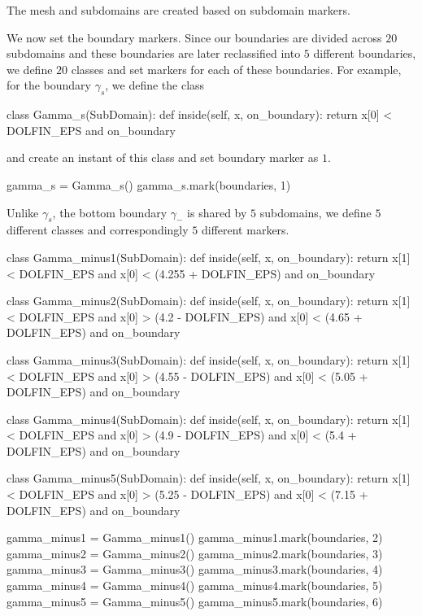 The mesh and subdomains are created based on subdomain markers.

We now set the boundary markers. Since our boundaries are divided across $20$ subdomains and these boundaries are later reclassified into $5$ different boundaries, we define $20$ classes and set markers for each of these boundaries. For example, for the boundary $\gamma_s$, we define the class
\begin{python}
class Gamma_s(SubDomain):
	def inside(self, x, on_boundary):
		return x[0] < DOLFIN_EPS and on_boundary
\end{python}
and create an instant of this class and set boundary marker as $1$.
\begin{python}
gamma_s = Gamma_s()
gamma_s.mark(boundaries, 1)
\end{python}

Unlike $\gamma_s$, the bottom boundary $\gamma_-$ is shared by $5$ subdomains, we define $5$ different classes and correspondingly $5$ different markers.

\begin{python}
class Gamma_minus1(SubDomain):
	def inside(self, x, on_boundary):
		return x[1] < DOLFIN_EPS and x[0] < (4.255 + DOLFIN_EPS) and on_boundary

class Gamma_minus2(SubDomain):
	def inside(self, x, on_boundary):
		return x[1] < DOLFIN_EPS and x[0] > (4.2 - DOLFIN_EPS) and x[0] < (4.65 + DOLFIN_EPS) and on_boundary

class Gamma_minus3(SubDomain):
	def inside(self, x, on_boundary):
		return x[1] < DOLFIN_EPS and x[0] > (4.55 - DOLFIN_EPS) and x[0] < (5.05 + DOLFIN_EPS) and on_boundary

class Gamma_minus4(SubDomain):
	def inside(self, x, on_boundary):
		return x[1] < DOLFIN_EPS and x[0] > (4.9 - DOLFIN_EPS) and x[0] < (5.4 + DOLFIN_EPS) and on_boundary

class Gamma_minus5(SubDomain):
	def inside(self, x, on_boundary):
		return x[1] < DOLFIN_EPS and x[0] > (5.25 - DOLFIN_EPS) and x[0] < (7.15 + DOLFIN_EPS) and on_boundary
\end{python}

\begin{python}
gamma_minus1 = Gamma_minus1()
gamma_minus1.mark(boundaries, 2)
gamma_minus2 = Gamma_minus2()
gamma_minus2.mark(boundaries, 3)
gamma_minus3 = Gamma_minus3()
gamma_minus3.mark(boundaries, 4)
gamma_minus4 = Gamma_minus4()
gamma_minus4.mark(boundaries, 5)
gamma_minus5 = Gamma_minus5()
gamma_minus5.mark(boundaries, 6)
\end{python}

